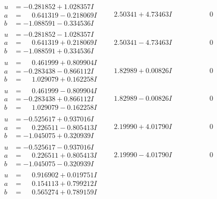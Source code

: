 \documentclass[1p]{elsarticle_modified}
\theoremstyle{definition}
\begin{document}
$$\begin{array}{c|c|c}
\begin{aligned}
u &= -0.281852 + 1.028357 I \\
a &= \phantom{-}0.641319 - 0.218069 I \\
b &= -1.088591 - 0.334536 I\end{aligned}
 & \phantom{-}2.50341 + 4.73463 I & \phantom{-0.000000 } 0 \\ \hline\begin{aligned}
u &= -0.281852 - 1.028357 I \\
a &= \phantom{-}0.641319 + 0.218069 I \\
b &= -1.088591 + 0.334536 I\end{aligned}
 & \phantom{-}2.50341 - 4.73463 I & \phantom{-0.000000 } 0 \\ \hline\begin{aligned}
u &= \phantom{-}0.461999 + 0.809904 I \\
a &= -0.283438 - 0.866112 I \\
b &= \phantom{-}1.029079 + 0.162258 I\end{aligned}
 & \phantom{-}1.82989 + 0.00826 I & \phantom{-0.000000 } 0 \\ \hline\begin{aligned}
u &= \phantom{-}0.461999 - 0.809904 I \\
a &= -0.283438 + 0.866112 I \\
b &= \phantom{-}1.029079 - 0.162258 I\end{aligned}
 & \phantom{-}1.82989 - 0.00826 I & \phantom{-0.000000 } 0 \\ \hline\begin{aligned}
u &= -0.525617 + 0.937016 I \\
a &= \phantom{-}0.226511 - 0.805413 I \\
b &= -1.045075 + 0.320939 I\end{aligned}
 & \phantom{-}2.19990 + 4.01790 I & \phantom{-0.000000 } 0 \\ \hline\begin{aligned}
u &= -0.525617 - 0.937016 I \\
a &= \phantom{-}0.226511 + 0.805413 I \\
b &= -1.045075 - 0.320939 I\end{aligned}
 & \phantom{-}2.19990 - 4.01790 I & \phantom{-0.000000 } 0 \\ \hline\begin{aligned}
u &= \phantom{-}0.916902 + 0.019751 I \\
a &= \phantom{-}0.154113 + 0.799212 I \\
b &= \phantom{-}0.565274 + 0.789159 I\end{aligned}

\end{array}$$
\end{document}
